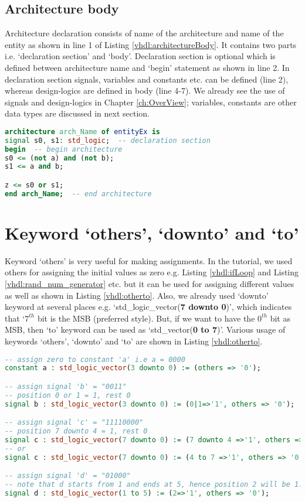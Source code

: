 \subsection{Architecture body}
Architecture declaration consists of name of the architecture and name of the entity as shown in line 1 of Listing \ref{vhdl:architectureBody}. It contains two parts i.e. `declaration section' and `body'. Declaration section is optional which is defined between architecture name and `begin' statement as shown in line 2. In declaration section signals, variables and constants etc. can be defined (line 2), whereas design-logics are defined in body (line 4-7). We already see the use of signals and design-logics in Chapter \ref{ch:OverView}; variables, constants are other data types are discussed in next section.

\begin{lstlisting}[language=Vhdl, caption={Architecture body}, label= {vhdl:architectureBody}]
architecture arch_Name of entityEx is 
signal s0, s1: std_logic;  -- declaration section
begin  -- begin architecture
s0 <= (not a) and (not b);
s1 <= a and b;

z <= s0 or s1;
end arch_Name;  -- end architecture
\end{lstlisting}

\section{Keyword `others', `downto' and `to'}\label{otherdownto} 
Keyword `others' is very useful for making assignments. In the tutorial, we used others for assigning the initial values as zero e.g. Listing \ref{vhdl:ifLoop} and Listing \ref{vhdl:rand_num_generator} etc. but it can be used for assigning different values as well as shown in Listing \ref{vhdl:otherto}. Also, we already used `downto' keyword at several places e.g. `std\_logic\_vector(\textbf{7 downto 0})', which indicates that `$7^{th}$ bit is the MSB (preferred style). But, if we want to have the $0^{th}$ bit as MSB, then `to' keyword can be used as `std\_vector(\textbf{0 to 7})'.  Various usage of keywords `others', `downto' and `to' are shown in Listing \ref{vhdl:otherto}. 
\begin{lstlisting}[language=Vhdl, caption={Keywords `others', `downto' and `to'}, label= {vhdl:otherto}]
-- assign zero to constant 'a' i.e a = 0000
constant a : std_logic_vector(3 downto 0) := (others => '0');

-- assign signal 'b' = "0011" 
-- position 0 or 1 = 1, rest 0
signal b : std_logic_vector(3 downto 0) := (0|1=>'1', others => '0');  

-- assign signal 'c' = "11110000" 
-- position 7 downto 4 = 1, rest 0
signal c : std_logic_vector(7 downto 0) := (7 downto 4 =>'1', others => '0');  
-- or
signal c : std_logic_vector(7 downto 0) := (4 to 7 =>'1', others => '0'); 

-- assign signal 'd' = "01000" 
-- note that d starts from 1 and ends at 5, hence position 2 will be 1.
signal d : std_logic_vector(1 to 5) := (2=>'1', others => '0');  
\end{lstlisting}

